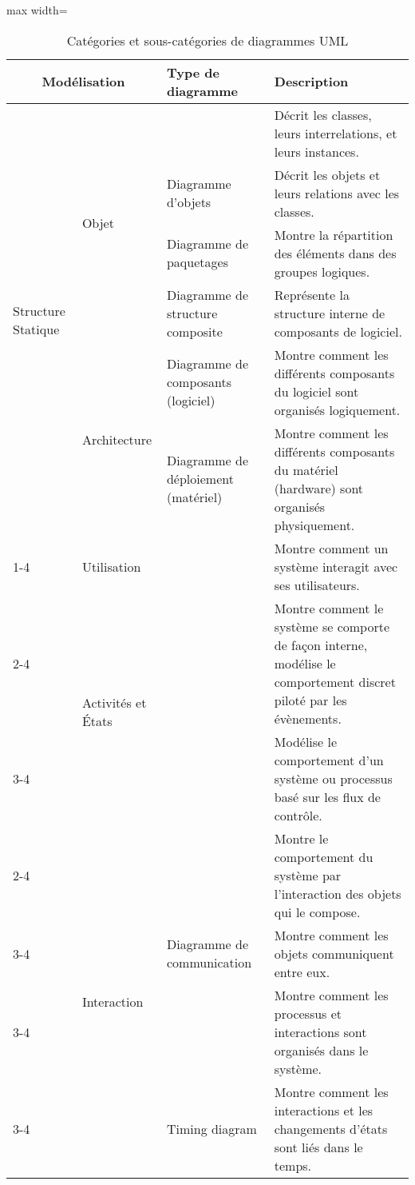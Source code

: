 \begin{table}[H]
\centering
\caption{Catégories et sous-catégories de diagrammes UML}
\label{tbl:uml}
\begin{adjustbox}{max width=\textwidth}
\begin{tabular}{p{7em}|p{6em}|p{10em}|p{40em}}
\toprule
\multicolumn{2}{c}{Modélisation} & Type de diagramme & Description \\
\midrule
\multirow{6}{7em}{Structure Statique} 
& \multirow{4}{*}{Objet}& \nameref{sec:diagramme_classe} 
& Décrit les classes, leurs interrelations, et leurs instances. \\
\cmidrule(lr){3-4}
&& Diagramme d'objets & Décrit les objets et leurs relations avec les classes. \\
\cmidrule(lr){3-4}
&& Diagramme de paquetages & Montre la répartition des éléments dans des groupes logiques. \\
\cmidrule(lr){3-4}
&& Diagramme de structure composite & Représente la structure interne de composants de logiciel. \\
\cmidrule(lr){2-4}
&\multirow{2}{*}{Architecture} & Diagramme de composants (logiciel) & Montre comment les différents composants du logiciel sont organisés logiquement. \\
\cmidrule(lr){3-4}
&& Diagramme de déploiement (matériel) & Montre comment les différents composants du matériel (hardware) sont organisés physiquement. \\
\cmidrule(lr){1-4}
\multirow{7}{7em}{Comportement Dynamique} 
& \multirow{1}{*}{Utilisation} & \nameref{sec:diagramme_casutilisation} 
& Montre comment un système interagit avec ses utilisateurs.\\
\cmidrule(lr){2-4}
&\multirow{2}{6em}{Activités et États} 
& \nameref{sec:diagramme_etatscomportementaux} & Montre comment le système se comporte de façon interne, modélise le comportement discret piloté par les évènements.\\
\cmidrule(lr){3-4}
&& \nameref{sec:diagramme_activite} & Modélise le comportement d’un système ou processus basé sur les flux de contrôle.\\
\cmidrule(lr){2-4}
&\multirow{4}{*}{Interaction} 
& \nameref{sec:diagramme_sequence} & Montre le comportement du système par l’interaction des objets qui le compose.\\
\cmidrule(lr){3-4}
&& Diagramme de communication & Montre comment les objets communiquent entre eux.\\
\cmidrule(lr){3-4}
&& \nameref{sec:diagramme_interaction} & Montre comment les processus et interactions sont organisés dans le système.\\
\cmidrule(lr){3-4}
&& Timing diagram & Montre comment les interactions et les changements d'états sont liés dans le temps.\\
\bottomrule
\end{tabular}
\end{adjustbox}
\end{table}
